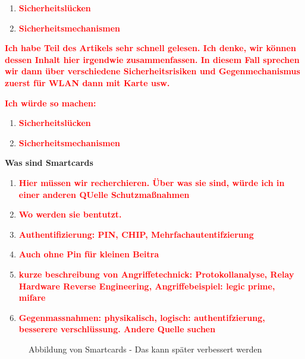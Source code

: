 \begin{enumerate}
    \item \textbf{\textcolor{red}{Sicherheitslücken}}
    \item \textbf{\textcolor{red}{Sicherheitsmechanismen}}
\end{enumerate}

\textbf{\textcolor{red}{Ich habe Teil des Artikels sehr schnell gelesen. Ich denke, wir können dessen Inhalt hier
irgendwie zusammenfassen. In diesem Fall sprechen wir dann über verschiedene Sicherheitsrisiken und Gegenmechanismus
zuerst für WLAN dann mit Karte usw. \cite{refmas:ASSS}}}

\textbf{\textcolor{red}{Ich würde so machen:}}



\begin{enumerate}
    \item \textbf{\textcolor{red}{Sicherheitslücken}}
    \item \textbf{\textcolor{red}{Sicherheitsmechanismen}}
\end{enumerate}

\textbf{Was sind Smartcards}
\begin{enumerate}
    \item \textbf{\textcolor{red}{Hier müssen wir recherchieren. Über was sie sind, würde ich in einer anderen QUelle Schutzmaßnahmen}}
    \item \textbf{\textcolor{red}{Wo werden sie bentutzt. }}
    \item \textbf{\textcolor{red}{Authentifizierung: PIN, CHIP, Mehrfachautentifzierung}}
    \item \textbf{\textcolor{red}{Auch ohne Pin für kleinen Beitra}}
    \item \textbf{\textcolor{red}{kurze beschreibung von Angriffetechnick: Protokollanalyse, Relay   Hardware Reverse Engineering, Angriffebeispiel: legic prime, mifare  }}
    \item \textbf{\textcolor{red}{Gegenmassnahmen: physikalisch, logisch: authentifzierung, besserere verschlüssung. Andere Quelle suchen }}
\end{enumerate}


\vfill
\begin{figure}[htb]
    \caption{Abbildung von Smartcards - Das kann später verbessert werden}
    \label{fig:refmas:ASSS}
\end{figure}
\vfill



